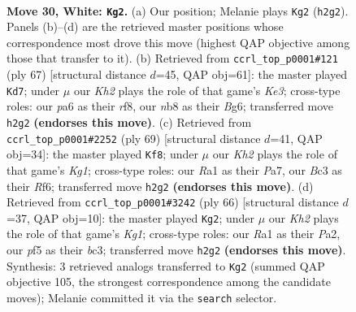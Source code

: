 \documentclass[11pt]{article}
\begin{document}
\clearpage

\begin{figure}[p]\centering
\begin{subfigure}{0.46\textwidth}\centering
\resizebox{\linewidth}{!}{%
\newchessgame
\chessboard[
  setfen={rn4k1/8/p7/3R1p1r/1P3P2/2B5/P3b2K/R7 w - - 1 30},
  showmover=false,
  pgfstyle=straightmove, color=movearrow, markmove={h2-g2}
]}
\caption{}
\end{subfigure}\hfill
\begin{subfigure}{0.46\textwidth}\centering
\resizebox{\linewidth}{!}{%
\newchessgame
\chessboard[
  setfen={5R2/2p4p/4kPb1/5r2/6r1/3P4/3BR2P/7K b - - 6 34},
  showmover=false,
  pgfstyle=straightmove, color=movearrow, markmove={e6-d7}
]}
\caption{}
\end{subfigure}
\\[4pt]
\begin{subfigure}{0.46\textwidth}\centering
\resizebox{\linewidth}{!}{%
\newchessgame
\chessboard[
  setfen={6k1/p4p2/5r2/8/1Pr4b/2NRP3/P5R1/6K1 b - - 4 35},
  showmover=false,
  pgfstyle=straightmove, color=movearrow, markmove={g8-f8}
]}
\caption{}
\end{subfigure}\hfill
\begin{subfigure}{0.46\textwidth}\centering
\resizebox{\linewidth}{!}{%
\newchessgame
\chessboard[
  setfen={4R3/5p1k/8/p2r2p1/2r1p1P1/2b1B3/P4P2/2R3K1 w - - 0 34},
  showmover=false,
  pgfstyle=straightmove, color=movearrow, markmove={g1-g2}
]}
\caption{}
\end{subfigure}
\caption{\textbf{Move 30, White: \texttt{Kg2}.} (a) Our position; Melanie plays \texttt{Kg2} (\texttt{h2g2}). Panels (b)--(d) are the retrieved master positions whose correspondence most drove this move (highest QAP objective among those that transfer to it). (b) Retrieved from \texttt{ccrl\_top\_p0001\#121} (ply 67) [structural distance $d$=45, QAP obj=61]: the master played \texttt{Kd7}; under $\mu$ our \emph{Kh2} plays the role of that game's \emph{Ke3}; cross-type roles: our \emph{p}a6 as their \emph{r}f8, our \emph{n}b8 as their \emph{B}g6; transferred move \texttt{h2g2} \textbf{(endorses this move)}. (c) Retrieved from \texttt{ccrl\_top\_p0001\#2252} (ply 69) [structural distance $d$=41, QAP obj=34]: the master played \texttt{Kf8}; under $\mu$ our \emph{Kh2} plays the role of that game's \emph{Kg1}; cross-type roles: our \emph{R}a1 as their \emph{P}a7, our \emph{B}c3 as their \emph{R}f6; transferred move \texttt{h2g2} \textbf{(endorses this move)}. (d) Retrieved from \texttt{ccrl\_top\_p0001\#3242} (ply 66) [structural distance $d$=37, QAP obj=10]: the master played \texttt{Kg2}; under $\mu$ our \emph{Kh2} plays the role of that game's \emph{Kg1}; cross-type roles: our \emph{R}a1 as their \emph{P}a2, our \emph{p}f5 as their \emph{b}c3; transferred move \texttt{h2g2} \textbf{(endorses this move)}. Synthesis: 3 retrieved analogs transferred to \texttt{Kg2} (summed QAP objective 105, the strongest correspondence among the candidate moves); Melanie committed it via the \texttt{search} selector.}
\label{fig:thought-m58}
\end{figure}
\end{document}
